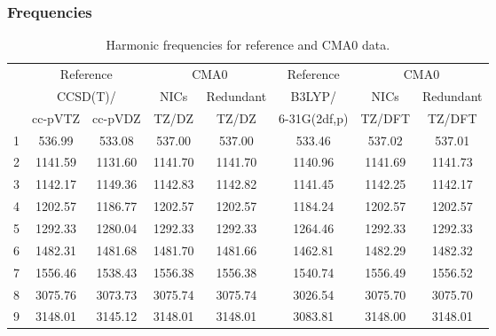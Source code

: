 \documentclass[10pt,oneside]{article}
\begin{document}
\begin{table}[h!]
\subsubsection*{Frequencies}
\centering
\caption{Harmonic frequencies for reference and CMA0 data.}
\begin{tabular}{cccccccc}
\toprule
{} & \multicolumn{2}{c}{Reference} & \multicolumn{2}{c}{CMA0} &    Reference & \multicolumn{2}{c}{CMA0} \\
{} & \multicolumn{2}{c}{CCSD(T)/} &    NICs &  Redundant &       B3LYP/ &    NICs & Redundant \\
{} &   cc-pVTZ & cc-pVDZ &   TZ/DZ &      TZ/DZ & 6-31G(2df,p) &  TZ/DFT &    TZ/DFT \\
\midrule
1 &    536.99 &  533.08 &  537.00 &     537.00 &       533.46 &  537.02 &    537.01 \\
2 &   1141.59 & 1131.60 & 1141.70 &    1141.70 &      1140.96 & 1141.69 &   1141.73 \\
3 &   1142.17 & 1149.36 & 1142.83 &    1142.82 &      1141.45 & 1142.25 &   1142.17 \\
4 &   1202.57 & 1186.77 & 1202.57 &    1202.57 &      1184.24 & 1202.57 &   1202.57 \\
5 &   1292.33 & 1280.04 & 1292.33 &    1292.33 &      1264.46 & 1292.33 &   1292.33 \\
6 &   1482.31 & 1481.68 & 1481.70 &    1481.66 &      1462.81 & 1482.29 &   1482.32 \\
7 &   1556.46 & 1538.43 & 1556.38 &    1556.38 &      1540.74 & 1556.49 &   1556.52 \\
8 &   3075.76 & 3073.73 & 3075.74 &    3075.74 &      3026.54 & 3075.70 &   3075.70 \\
9 &   3148.01 & 3145.12 & 3148.01 &    3148.01 &      3083.81 & 3148.00 &   3148.01 \\
\bottomrule
\end{tabular}
\end{table}
\end{document}
